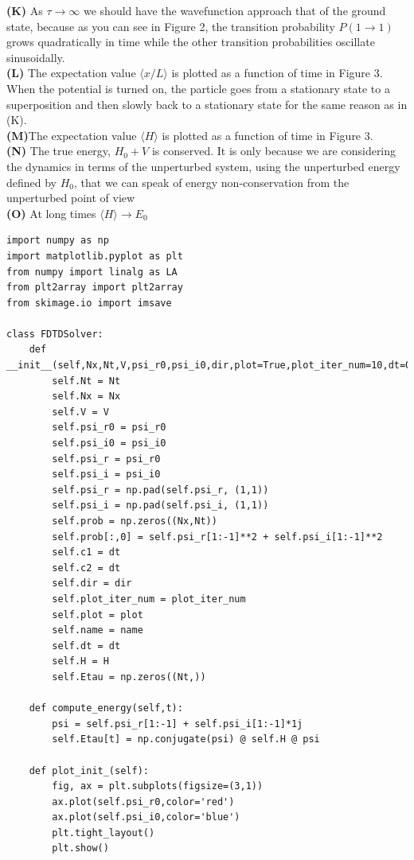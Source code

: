 \documentclass[12pt]{article}
\theoremstyle{definition}
\begin{document}
{\noindent \textbf{(K)} As $\tau\rightarrow \infty$ we should have the wavefunction approach that of the ground state, because as you can see in Figure 2, the transition probability $P(1\rightarrow 1)$ grows quadratically in time while the other transition probabilities oscillate sinusoidally. 
\\
\noindent \textbf{(L)} The expectation value $\langle x/L\rangle$ is plotted as a function of time in Figure 3. When the potential is turned on, the particle goes from a stationary state to a superposition and then slowly back to a stationary state for the same reason as in (K).\\
\noindent \textbf{(M)}The expectation value $\langle H\rangle$ is plotted as a function of time in Figure 3.\\
\noindent \textbf{(N)} The true energy, $H_{0} + V$ is conserved. It is only because we are considering the dynamics in terms of the unperturbed system, using the unperturbed energy defined by $H_{0}$, that we can speak of energy non-conservation from the unperturbed point of view \\
\noindent \textbf{(O)} At long times $\langle H \rangle \rightarrow E_{0}$\\



\clearpage


\begin{lstlisting}
import numpy as np
import matplotlib.pyplot as plt
from numpy import linalg as LA
from plt2array import plt2array
from skimage.io import imsave

class FDTDSolver:
    def __init__(self,Nx,Nt,V,psi_r0,psi_i0,dir,plot=True,plot_iter_num=10,dt=0.1,name='sim',H=None):
        self.Nt = Nt
        self.Nx = Nx
        self.V = V
        self.psi_r0 = psi_r0
        self.psi_i0 = psi_i0
        self.psi_r = psi_r0
        self.psi_i = psi_i0
        self.psi_r = np.pad(self.psi_r, (1,1))
        self.psi_i = np.pad(self.psi_i, (1,1))
        self.prob = np.zeros((Nx,Nt))
        self.prob[:,0] = self.psi_r[1:-1]**2 + self.psi_i[1:-1]**2
        self.c1 = dt
        self.c2 = dt
        self.dir = dir
        self.plot_iter_num = plot_iter_num
        self.plot = plot
        self.name = name
        self.dt = dt
        self.H = H
        self.Etau = np.zeros((Nt,))

    def compute_energy(self,t):
        psi = self.psi_r[1:-1] + self.psi_i[1:-1]*1j
        self.Etau[t] = np.conjugate(psi) @ self.H @ psi

    def plot_init_(self):
        fig, ax = plt.subplots(figsize=(3,1))
        ax.plot(self.psi_r0,color='red')
        ax.plot(self.psi_i0,color='blue')
        plt.tight_layout()
        plt.show()


\end{lstlisting}}
\end{document}
